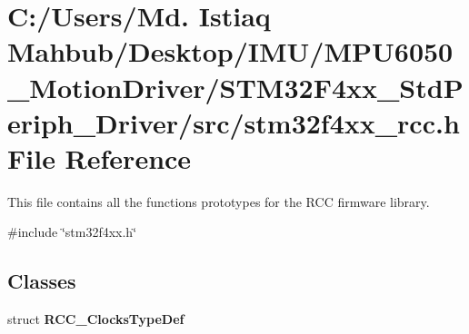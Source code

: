 \section{C\+:/\+Users/\+Md. Istiaq Mahbub/\+Desktop/\+I\+M\+U/\+M\+P\+U6050\+\_\+\+Motion\+Driver/\+S\+T\+M32\+F4xx\+\_\+\+Std\+Periph\+\_\+\+Driver/src/stm32f4xx\+\_\+rcc.h File Reference}
\label{stm32f4xx__rcc_8h}


This file contains all the functions prototypes for the R\+CC firmware library.  


{\ttfamily \#include \char`\"{}stm32f4xx.\+h\char`\"{}}\newline
\subsection*{Classes}
\begin{DoxyCompactItemize}
\item 
struct \textbf{ R\+C\+C\+\_\+\+Clocks\+Type\+Def}
\end{DoxyCompactItemize}
